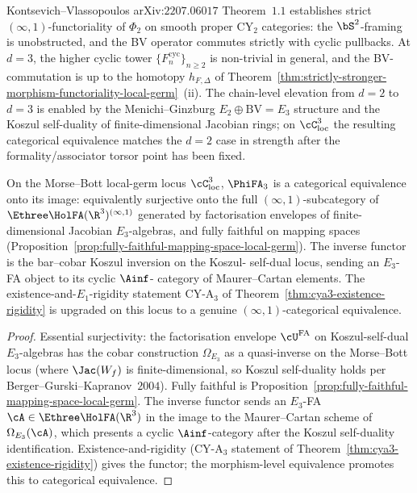 \begin{remark}[Relation to the Kontsevich--Vlassopoulos \texorpdfstring{$d = 2$}{d = 2} morphism-level theorem]
\label{rem:KV-d2-vs-d3-morphism-level}
Kontsevich--Vlassopoulos arXiv:$2207.06017$ Theorem~$1.1$ establishes
strict $(\infty,1)$-functoriality of $\Phi_2$ on smooth proper CY$_2$
categories: the $\bS^2$-framing is unobstructed, and the BV operator
commutes strictly with cyclic pullbacks. At $d = 3$, the higher
cyclic tower $\{F_n^{\mathrm{cyc}}\}_{n \geq 2}$ is non-trivial in
general, and the BV-commutation is up to the homotopy $h_{F, \Delta}$
of Theorem~\ref{thm:strictly-stronger-morphism-functoriality-local-germ}~\textup{(ii)}.
The chain-level elevation from $d = 2$ to $d = 3$ is enabled by the
Menichi--Ginzburg $E_2 \oplus \mathrm{BV} = E_3$ structure and the
Koszul self-duality of finite-dimensional Jacobian rings; on
$\cC_{\mathrm{loc}}^3$ the resulting categorical equivalence matches
the $d = 2$ case in strength after the formality/associator torsor point
has been fixed.
\end{remark}

\begin{corollary}
\label{cor:cy-a3-categorical-equivalence-local-germ}
On the Morse--Bott local-germ locus $\cC_{\mathrm{loc}}^3$, $\PhiFA_3$
is a categorical equivalence onto its image: equivalently surjective
onto the full $(\infty,1)$-subcategory of $\Ethree\HolFA(\R^3)^{(\infty,1)}$
generated by factorisation envelopes of finite-dimensional Jacobian
$E_3$-algebras, and fully faithful on mapping spaces
(Proposition~\ref{prop:fully-faithful-mapping-space-local-germ}). The
inverse functor is the bar--cobar Koszul inversion on the Koszul-
self-dual locus, sending an $E_3$-FA object to its cyclic $\Ainf$-
category of Maurer--Cartan elements. The existence-and-$E_1$-rigidity
statement CY-A$_3$ of Theorem~\ref{thm:cya3-existence-rigidity} is
upgraded on this locus to a genuine $(\infty,1)$-categorical
equivalence.
\end{corollary}

\begin{proof}
Essential surjectivity: the factorisation envelope $\cU^{\mathrm{FA}}$
on Koszul-self-dual $E_3$-algebras has the cobar construction
$\Omega_{E_3}$ as a quasi-inverse on the Morse--Bott locus (where
$\Jac(W_f)$ is finite-dimensional, so Koszul self-duality holds per
Berger--Gurski--Kapranov~$2004$). Fully faithful is
Proposition~\ref{prop:fully-faithful-mapping-space-local-germ}. The
inverse functor sends an $E_3$-FA $\cA \in \Ethree\HolFA(\R^3)$ in the
image to the Maurer--Cartan scheme of $\Omega_{E_3}(\cA)$, which
presents a cyclic $\Ainf$-category after the Koszul self-duality
identification. Existence-and-rigidity (CY-A$_3$ statement of
Theorem~\ref{thm:cya3-existence-rigidity}) gives the functor; the
morphism-level equivalence promotes this to categorical equivalence.
\end{proof}

